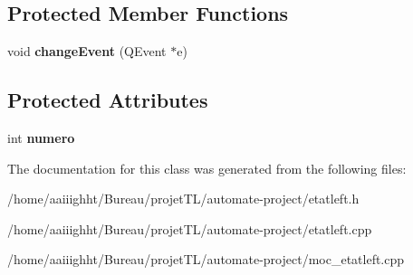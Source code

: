 \subsection*{Protected Member Functions}
\begin{DoxyCompactItemize}
\item 
\hypertarget{classetat_left_a3509079b87d2584825e12adddcfb1a32}{void {\bfseries change\-Event} (Q\-Event $\ast$e)}\label{classetat_left_a3509079b87d2584825e12adddcfb1a32}

\end{DoxyCompactItemize}
\subsection*{Protected Attributes}
\begin{DoxyCompactItemize}
\item 
\hypertarget{classetat_left_acf1c86368edc9def78782bf5db7aa651}{int {\bfseries numero}}\label{classetat_left_acf1c86368edc9def78782bf5db7aa651}

\end{DoxyCompactItemize}


The documentation for this class was generated from the following files\-:\begin{DoxyCompactItemize}
\item 
/home/aaiiighht/\-Bureau/projet\-T\-L/automate-\/project/etatleft.\-h\item 
/home/aaiiighht/\-Bureau/projet\-T\-L/automate-\/project/etatleft.\-cpp\item 
/home/aaiiighht/\-Bureau/projet\-T\-L/automate-\/project/moc\-\_\-etatleft.\-cpp\end{DoxyCompactItemize}
